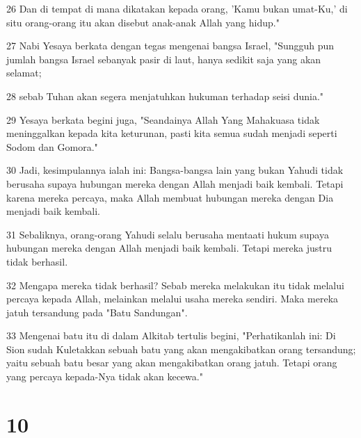 \par 26 Dan di tempat di mana dikatakan kepada orang, 'Kamu bukan umat-Ku,' di situ orang-orang itu akan disebut anak-anak Allah yang hidup."
\par 27 Nabi Yesaya berkata dengan tegas mengenai bangsa Israel, "Sungguh pun jumlah bangsa Israel sebanyak pasir di laut, hanya sedikit saja yang akan selamat;
\par 28 sebab Tuhan akan segera menjatuhkan hukuman terhadap seisi dunia."
\par 29 Yesaya berkata begini juga, "Seandainya Allah Yang Mahakuasa tidak meninggalkan kepada kita keturunan, pasti kita semua sudah menjadi seperti Sodom dan Gomora."
\par 30 Jadi, kesimpulannya ialah ini: Bangsa-bangsa lain yang bukan Yahudi tidak berusaha supaya hubungan mereka dengan Allah menjadi baik kembali. Tetapi karena mereka percaya, maka Allah membuat hubungan mereka dengan Dia menjadi baik kembali.
\par 31 Sebaliknya, orang-orang Yahudi selalu berusaha mentaati hukum supaya hubungan mereka dengan Allah menjadi baik kembali. Tetapi mereka justru tidak berhasil.
\par 32 Mengapa mereka tidak berhasil? Sebab mereka melakukan itu tidak melalui percaya kepada Allah, melainkan melalui usaha mereka sendiri. Maka mereka jatuh tersandung pada "Batu Sandungan".
\par 33 Mengenai batu itu di dalam Alkitab tertulis begini, "Perhatikanlah ini: Di Sion sudah Kuletakkan sebuah batu yang akan mengakibatkan orang tersandung; yaitu sebuah batu besar yang akan mengakibatkan orang jatuh. Tetapi orang yang percaya kepada-Nya tidak akan kecewa."

\chapter{10}

